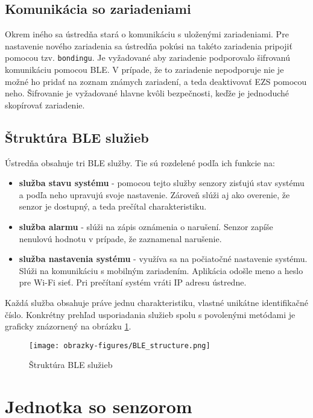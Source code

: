 \subsection{Komunikácia so zariadeniami}

Okrem iného sa ústredňa stará o komunikáciu s uloženými zariadeniami. Pre nastavenie nového zariadenia sa ústredňa pokúsi na takéto zariadenia pripojiť pomocou tzv. \texttt{bondingu}. Je vyžadované aby zariadenie podporovalo šifrovanú komunikáciu pomocou BLE. V prípade, že to zariadenie nepodporuje nie je možné ho pridať na zoznam známych zariadení, a teda deaktivovať EZS pomocou neho. Šifrovanie je vyžadované hlavne kvôli bezpečnosti, keďže je jednoduché skopírovať zariadenie.

\subsection{Štruktúra BLE služieb}\label{sec:BLE_struc}

Ústredňa obsahuje tri BLE služby. Tie sú rozdelené podľa ich funkcie na:
\begin{itemize}
    \item \textbf{služba stavu systému} - pomocou tejto služby senzory zisťujú stav systému a podľa neho upravujú svoje nastavenie. Zároveň slúži aj ako overenie, že senzor je dostupný, a teda prečítal charakteristiku.
    \item \textbf{služba alarmu} - slúži na zápis oznámenia o narušení. Senzor zapíše nenulovú hodnotu v prípade, že zaznamenal narušenie.
    \item \textbf{služba nastavenia systému} - využíva sa na počiatočné nastavenie systému. Slúži na komunikáciu s mobilným zariadením. Aplikácia odošle meno a heslo pre Wi-Fi sieť. Pri prečítaní systém vráti IP adresu ústredne.
\end{itemize}

Každá služba obsahuje práve jednu charakteristiku, vlastné unikátne identifikačné číslo. Konkrétny prehľad usporiadania služieb spolu s povolenými metódami je graficky znázornený na obrázku \ref{fig:BLE_structure}.

\begin{figure}[ht]
    \centering
    \texttt{[image: obrazky-figures/BLE\_structure.png]}
    \caption{Štruktúra BLE služieb}
    \label{fig:BLE_structure}
\end{figure}

\section{Jednotka so senzorom}

